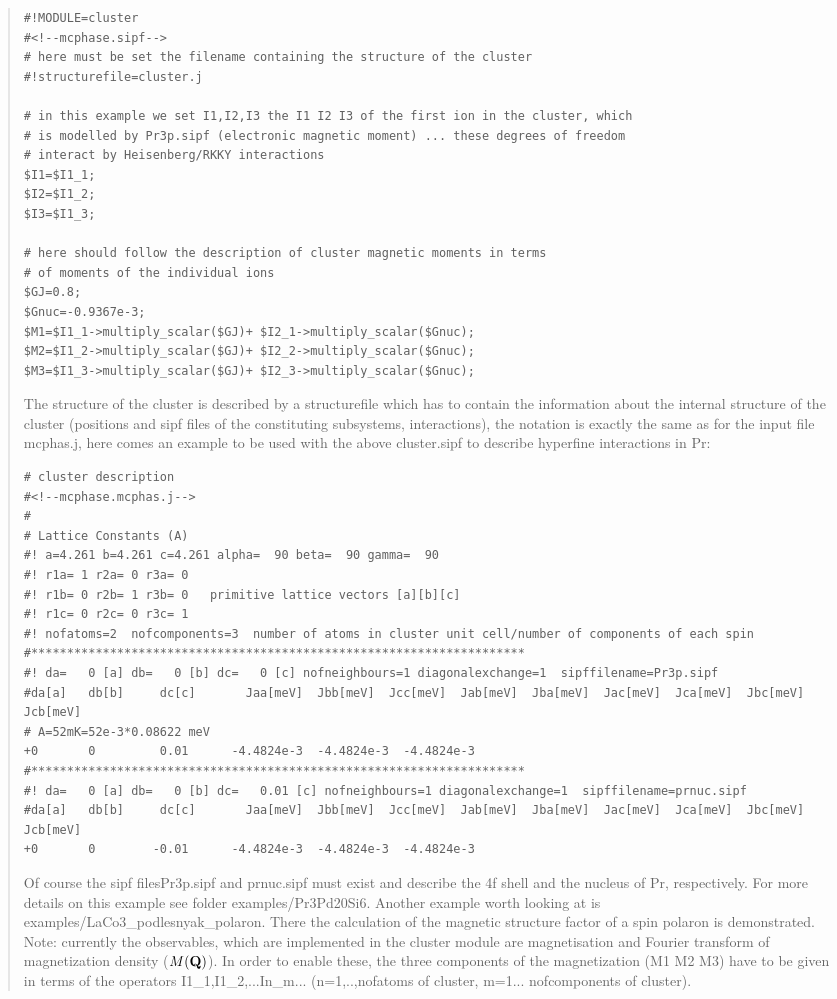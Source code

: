 \begin{quote}
\begin{verbatim}
#!MODULE=cluster
#<!--mcphase.sipf-->
# here must be set the filename containing the structure of the cluster
#!structurefile=cluster.j

# in this example we set I1,I2,I3 the I1 I2 I3 of the first ion in the cluster, which 
# is modelled by Pr3p.sipf (electronic magnetic moment) ... these degrees of freedom
# interact by Heisenberg/RKKY interactions
$I1=$I1_1;
$I2=$I1_2;
$I3=$I1_3;

# here should follow the description of cluster magnetic moments in terms
# of moments of the individual ions
$GJ=0.8;
$Gnuc=-0.9367e-3;
$M1=$I1_1->multiply_scalar($GJ)+ $I2_1->multiply_scalar($Gnuc);
$M2=$I1_2->multiply_scalar($GJ)+ $I2_2->multiply_scalar($Gnuc);
$M3=$I1_3->multiply_scalar($GJ)+ $I2_3->multiply_scalar($Gnuc); 
\end{verbatim}

The structure of the cluster is described by a structurefile which has
to contain the information about the internal structure of the cluster
(positions and sipf files of the constituting subsystems, interactions),
the notation is exactly the same as for the input file {\prg mcphas.j},
here comes an example to be used with the above {\prg cluster.sipf} to describe
hyperfine interactions in Pr:
\begin{verbatim}
# cluster description
#<!--mcphase.mcphas.j-->
#
# Lattice Constants (A)
#! a=4.261 b=4.261 c=4.261 alpha=  90 beta=  90 gamma=  90
#! r1a= 1 r2a= 0 r3a= 0
#! r1b= 0 r2b= 1 r3b= 0   primitive lattice vectors [a][b][c]
#! r1c= 0 r2c= 0 r3c= 1
#! nofatoms=2  nofcomponents=3  number of atoms in cluster unit cell/number of components of each spin
#*********************************************************************
#! da=   0 [a] db=   0 [b] dc=   0 [c] nofneighbours=1 diagonalexchange=1  sipffilename=Pr3p.sipf
#da[a]   db[b]     dc[c]       Jaa[meV]  Jbb[meV]  Jcc[meV]  Jab[meV]  Jba[meV]  Jac[meV]  Jca[meV]  Jbc[meV]  Jcb[meV]
# A=52mK=52e-3*0.08622 meV
+0       0         0.01      -4.4824e-3  -4.4824e-3  -4.4824e-3
#*********************************************************************
#! da=   0 [a] db=   0 [b] dc=   0.01 [c] nofneighbours=1 diagonalexchange=1  sipffilename=prnuc.sipf
#da[a]   db[b]     dc[c]       Jaa[meV]  Jbb[meV]  Jcc[meV]  Jab[meV]  Jba[meV]  Jac[meV]  Jca[meV]  Jbc[meV]  Jcb[meV]
+0       0        -0.01      -4.4824e-3  -4.4824e-3  -4.4824e-3
\end{verbatim}
Of course the sipf files{\prg Pr3p.sipf }and {\prg prnuc.sipf} must exist and describe
the 4f shell and the nucleus of Pr, respectively. For more details on this
example see folder {\prg examples/Pr3Pd20Si6}. Another example worth looking
at is {\prg examples/LaCo3\_podlesnyak\_polaron}. There the calculation of the 
magnetic structure factor of a spin polaron is demonstrated.
Note: currently the observables, which are implemented in the cluster module are 
magnetisation and Fourier transform of magnetization density ($M(\mathbf Q)$).
In order to enable these, the three components of the magnetization (M1 M2 M3)
have to be given in terms of the operators I1\_1,I1\_2,...In\_m... (n=1,..,nofatoms of cluster,
m=1... nofcomponents of cluster). 
\end{quote}

